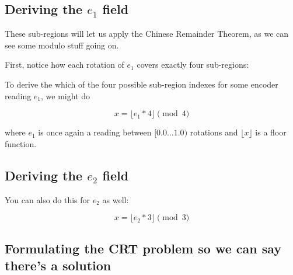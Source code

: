 \documentclass[11pt]{article}
\begin{document}
\subsection{Deriving the $e_1$ field}

These sub-regions will let us apply the Chinese Remainder Theorem, as we can see some modulo stuff going on.

First, notice how each rotation of $e_1$ covers exactly four sub-regions:

\begin{figure}[ht]
    \center
\end{figure}

To derive the which of the four possible sub-region indexes for some encoder reading $e_1$, we might do

\[
    x = \lfloor e_1 * 4 \rfloor \pmod{4}
\]

where $e_1$ is once again a reading between $[0.0\dots1.0)$ rotations and $\lfloor x \rfloor$ is a floor function.

\subsection{Deriving the $e_2$ field}

You can also do this for $e_2$ as well:

\begin{figure}[ht]
    \center
\end{figure}

\[
    x = \lfloor e_2 * 3 \rfloor \pmod{3}
\]

\subsection{Formulating the CRT problem so we can say there's a solution}
\end{document}
